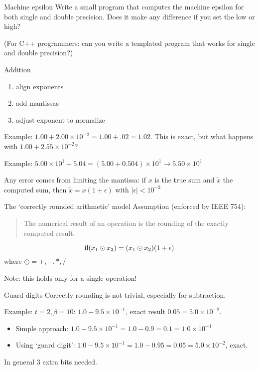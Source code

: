 \begin{exercise}{Machine epsilon}
  Write a small program that computes the machine epsilon for both
  single and double precision. Does it
  make any difference if you set the
   low or high? 

  (For C++ programmers: can you write a templated program that works
  for single and double precision?)
\end{exercise}

\begin{numberedframe}{Addition}
  \begin{enumerate}
  \item align exponents
  \item add mantissas
  \item adjust exponent to normalize
  \end{enumerate}

Example: $1.00+2.00\times 10^{-2}=1.00+.02=1.02$. This is exact, but
what happens with $1.00+2.55\times 10^{-2}$?

Example: $5.00\times 10^{1}+5.04=(5.00+0.504)\times10^1
\rightarrow5.50\times10^1$

Any error comes from limiting the mantissa: if $x$ is the true sum
and $\tilde x$ the computed sum, then $\tilde x=x(1+\epsilon)$ with 
$|\epsilon|<10^{-2}$
\end{numberedframe}

\begin{numberedframe}{The `correctly rounded arithmetic' model}
Assumption (enforced by IEEE 754):
\begin{quotation}
  The numerical result of an operation is the rounding of the exactly
  computed result.
\end{quotation}
\[ \mathop{\mathrm{fl}}(x_1\odot x_2) = (x_1\odot x_2)(1+\epsilon) \]
where $\odot=+,-,*,/$

Note: this holds only for a single operation!
\end{numberedframe}

\begin{numberedframe}{Guard digits}
Correctly rounding is not trivial, especially for subtraction.

Example: $t=2, \beta=10$: $1.0-9.5\times 10^{-1}$, exact result
$0.05=5.0\times 10^{-2}$.
\begin{itemize}
\item Simple approach: $1.0-9.5\times 10^{-1}=1.0-0.9=0.1=1.0\times
  10^{-1}$
\item Using `guard digit': $1.0-9.5\times
  10^{-1}=1.0-0.95=0.05=5.0\times 10^{-2}$, exact.
\end{itemize}
In general 3 extra bits needed.
\end{numberedframe}

